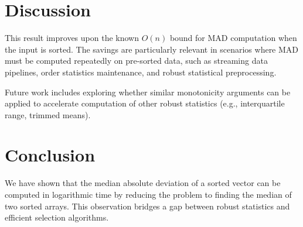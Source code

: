 \documentclass[11pt]{article}
\begin{document}
\section{Discussion}
This result improves upon the known $O(n)$ bound for MAD computation when the input is sorted. The savings are particularly relevant in scenarios where MAD must be computed repeatedly on pre-sorted data, such as streaming data pipelines, order statistics maintenance, and robust statistical preprocessing.

Future work includes exploring whether similar monotonicity arguments can be applied to accelerate computation of other robust statistics (e.g., interquartile range, trimmed means).

\section{Conclusion}
We have shown that the median absolute deviation of a sorted vector can be computed in logarithmic time by reducing the problem to finding the median of two sorted arrays. This observation bridges a gap between robust statistics and efficient selection algorithms.
\end{document}
